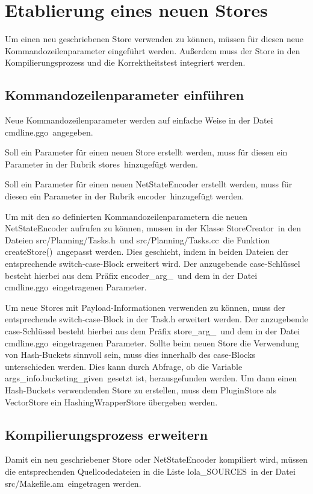 \documentclass[12pt,a4paper,titlepage]{scrartcl}
\renewcommand \( {\left (}
\renewcommand \) {\right )}
\renewcommand \[ {\left [}
\renewcommand \] {\right ]}
\newcommand \Flqq {\flqq\ }
\begin{document}
\section{Etablierung eines neuen Stores}
\label{kap:Etablierung}
Um einen neu geschriebenen Store verwenden zu können, müssen für diesen neue Kommandozeilenparameter eingeführt werden. Außerdem muss der Store in den Kompilierungsprozess und die Korrektheitstest integriert werden.

\subsection{Kommandozeilenparameter einführen}
Neue Kommandozeilenparameter werden auf einfache Weise in der Datei \frqq cmdline.ggo\Flqq angegeben.

Soll ein Parameter für einen neuen Store erstellt werden, muss für diesen ein Parameter in der Rubrik \frqq stores\Flqq hinzugefügt werden.

Soll ein Parameter für einen neuen NetStateEncoder erstellt werden, muss für diesen ein Parameter in der Rubrik \frqq encoder\Flqq hinzugefügt werden.

Um mit den so definierten Kommandozeilenparametern die neuen NetStateEncoder aufrufen zu können, mussen in der Klasse \frqq StoreCreator\Flqq in den Dateien \frqq src/Planning/Tasks.h\Flqq und \frqq src/Planning/Tasks.cc\Flqq die Funktion \frqq createStore()\Flqq angepasst werden. Dies geschieht, indem in beiden Dateien der entsprechende switch-case-Block erweitert wird. Der anzugebende case-Schlüssel besteht hierbei aus dem Präfix \frqq encoder\_arg\_\Flqq und dem in der Datei \frqq cmdline.ggo\Flqq eingetragenen Parameter.

Um neue Stores mit Payload-Informationen verwenden zu können, muss der entsprechende switch-case-Block in der Task.h erweitert werden. Der anzugebende case-Schlüssel besteht hierbei aus dem Präfix \frqq store\_arg\_\Flqq und dem in der Datei \frqq cmdline.ggo\Flqq eingetragenen Parameter. Sollte beim neuen Store die Verwendung von Hash-Buckets sinnvoll sein, muss dies innerhalb des case-Blocks unterschieden werden. Dies kann durch Abfrage, ob die Variable \frqq args\_info.bucketing\_given\Flqq gesetzt ist, herausgefunden werden. Um dann einen Hash-Buckets verwendenden Store zu erstellen, muss dem PluginStore als VectorStore ein HashingWrapperStore übergeben werden.


\subsection{Kompilierungsprozess erweitern}
Damit ein neu geschriebener Store oder NetStateEncoder kompiliert wird, müssen die entsprechenden Quellcodedateien in die Liste \frqq lola\_SOURCES\Flqq in der Datei \frqq src/Makefile.am\Flqq eingetragen werden.
\end{document}
